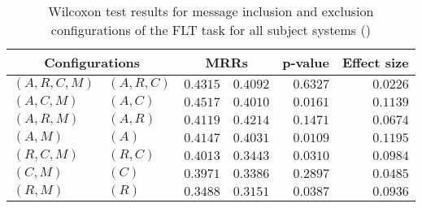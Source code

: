 
\begin{table}
\begin{spacing}{1.2}
\centering
\caption{Wilcoxon test results for message inclusion and exclusion configurations of the FLT task for all subject systems (\ctwo)}
\label{table:versus-wilcox-all-flt-message}
\begin{tabular}{ll|rr|rr}
\toprule
      \multicolumn{2}{c|}{Configurations} &                \multicolumn{2}{c|}{MRRs} &             p-value & Effect size \\
\midrule
 $(A,R,C,M)$ &  $(A,R,C)$ &  $\bm{0.4315}$ &       $0.4092$ & $0.6327$ &    $0.0226$ \\
   $(A,C,M)$ &    $(A,C)$ &  $\bm{0.4517}$ &       $0.4010$ & $0.0161$ &    $0.1139$ \\
   $(A,R,M)$ &    $(A,R)$ &       $0.4119$ &  $\bm{0.4214}$ & $0.1471$ &    $0.0674$ \\
     $(A,M)$ &      $(A)$ &  $\bm{0.4147}$ &       $0.4031$ & $0.0109$ &    $0.1195$ \\
   $(R,C,M)$ &    $(R,C)$ &  $\bm{0.4013}$ &       $0.3443$ & $0.0310$ &    $0.0984$ \\
     $(C,M)$ &      $(C)$ &  $\bm{0.3971}$ &       $0.3386$ & $0.2897$ &    $0.0485$ \\
     $(R,M)$ &      $(R)$ &  $\bm{0.3488}$ &       $0.3151$ & $0.0387$ &    $0.0936$ \\
\bottomrule
\end{tabular}

\end{spacing}
\end{table}

